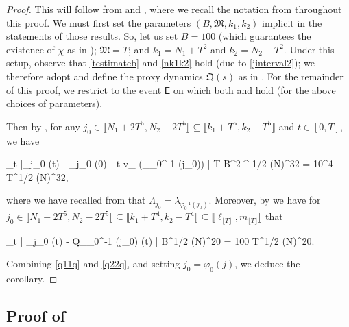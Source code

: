 \documentclass{amsart}
\numberwithin{equation}{section}
\DeclareMathOperator{\eff}{eff}
\theoremstyle{remark}
\theoremstyle{definition}
\begin{document}
	\begin{proof} 
		
		
		This will follow from  and , where we recall the notation from  throughout this proof. We must first set the parameters $(B, \mathfrak{M}, k_1, k_2)$ implicit in the statements of those results. So, let us set $B = 100$ (which guarantees the existence of $\chi$ as in ); $\mathfrak{M} = T$; and $k_1 = N_1 + T^2$ and $k_2 = N_2 - T^2$. Under this setup, observe that \eqref{testimateb} and \eqref{nk1k2} hold (due to \eqref{jinterval2}); we therefore adopt  and define the proxy dynamics $\bm{\mathfrak{Q}}(s)$ as in . For the remainder of this proof, we restrict to the event $\mathsf{E}$ on which both  and  hold (for the above choices of parameters). 
		
		Then by , for any $j_0 \in \llbracket N_1 + 2T^5, N_2 - 2T^5 \rrbracket \subseteq \llbracket k_1 + T^5, k_2 - T^5 \rrbracket$ and $t \in [0,T]$, we have 
		\begin{flalign}
			\label{q11q} 
			\displaystyle\max_{t \in [0,T]} \big|_{j_0} (t) - _{j_0} (0) - t v_{\eff} (\lambda_{\varphi_0^{-1} (j_0)}) \big| \le T \cdot B^2 ^{-1/2} (\log N)^{32} = 10^4 \cdot T^{1/2} (\log N)^{32},
		\end{flalign}
		
		\noindent where we have recalled from  that $\Lambda_{j_0} = \lambda_{\varphi_0^{-1} (j_0)}$. Moreover, by  we have for $j_0 \in \llbracket N_1 + 2T^5, N_2 - 2T^5 \rrbracket \subseteq \llbracket k_1 + T^4, k_2 - T^4 \rrbracket \subseteq \llbracket \ell_{\lfloor T \rfloor}, m_{\lfloor T \rfloor} \rrbracket$ that 
		\begin{flalign}
			\label{q22q} 
			\displaystyle\max_{t \in [0,T]} \big| _{j_0} (t) - Q_{\varphi_0^{-1} (j_0)} (t) \big| \le B^{1/2} (\log N)^{20} = 100 T^{1/2} (\log N)^{20}.
		\end{flalign}
		
		\noindent Combining \eqref{q11q} and \eqref{q22q}, and setting $j_0 = \varphi_0 (j)$, we deduce the corollary.
	\end{proof} 
	
	
	
	\subsection{Proof of }
	
\end{document}
